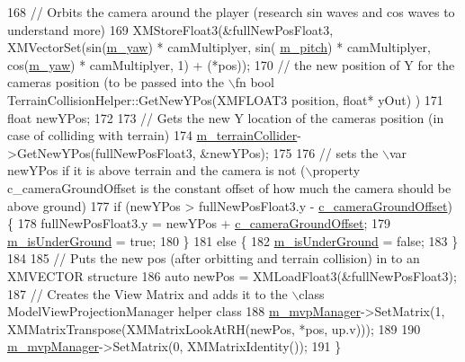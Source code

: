 \begin{DoxyCode}
168     \textcolor{comment}{// Orbits the camera around the player (research sin waves and cos waves to understand more)}
169     XMStoreFloat3(&fullNewPosFloat3, XMVectorSet(sin(\mbox{\hyperlink{class_camera_helper_a9bdda4839839b4329188fc44517e8b01}{m\_yaw}}) * camMultiplyer, sin(
      \mbox{\hyperlink{class_camera_helper_ae2a32d581a829b05300d7298b5622469}{m\_pitch}}) * camMultiplyer, cos(\mbox{\hyperlink{class_camera_helper_a9bdda4839839b4329188fc44517e8b01}{m\_yaw}}) * camMultiplyer, 1) + (*pos));
170     \textcolor{comment}{// the new position of Y for the cameras position (to be passed into the \(\backslash\)fn bool
       TerrainCollisionHelper::GetNewYPos(XMFLOAT3 position, float* yOut) )}
171     \textcolor{keywordtype}{float} newYPos;
172 
173     \textcolor{comment}{// Gets the new Y location of the cameras position (in case of colliding with terrain)}
174     \mbox{\hyperlink{class_camera_helper_a5ce949723d775603a605ffcd9cc68bbc}{m\_terrainCollider}}->GetNewYPos(fullNewPosFloat3, &newYPos);
175 
176     \textcolor{comment}{// sets the \(\backslash\)var newYPos if it is above terrain and the camera is not (\(\backslash\)property c\_cameraGroundOffset
       is the constant offset of how much the camera should be above ground)}
177     \textcolor{keywordflow}{if} (newYPos > fullNewPosFloat3.y - \mbox{\hyperlink{class_camera_helper_ac0b6f1a7975e28a7604985da3f29278b}{c\_cameraGroundOffset}}) \{
178         fullNewPosFloat3.y = newYPos + \mbox{\hyperlink{class_camera_helper_ac0b6f1a7975e28a7604985da3f29278b}{c\_cameraGroundOffset}};
179         \mbox{\hyperlink{class_camera_helper_a58fe7fb37f0bda549c7a8cc59fb58042}{m\_isUnderGround}} = \textcolor{keyword}{true};
180     \}
181     \textcolor{keywordflow}{else} \{
182         \mbox{\hyperlink{class_camera_helper_a58fe7fb37f0bda549c7a8cc59fb58042}{m\_isUnderGround}} = \textcolor{keyword}{false};
183     \}
184     
185     \textcolor{comment}{// Puts the new pos (after orbitting and terrain collision) in to an XMVECTOR structure}
186     \textcolor{keyword}{auto} newPos = XMLoadFloat3(&fullNewPosFloat3);
187     \textcolor{comment}{// Creates the View Matrix and adds it to the \(\backslash\)class ModelViewProjectionManager helper class}
188     \mbox{\hyperlink{class_camera_helper_a10d96783299a8c958f84d46542a3d93f}{m\_mvpManager}}->SetMatrix(1, XMMatrixTranspose(XMMatrixLookAtRH(newPos, *pos, up.v)));
189 
190     \mbox{\hyperlink{class_camera_helper_a10d96783299a8c958f84d46542a3d93f}{m\_mvpManager}}->SetMatrix(0, XMMatrixIdentity());
191 \}
\end{DoxyCode}


